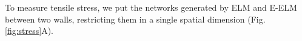 \documentclass[nofootinbib,preprint,floatfix,titlepage,endfloats]{revtex4} %
\begin{document}

 
To measure tensile stress, we put the networks generated by ELM and E-ELM between two walls, restricting them in a single spatial dimension (Fig. \ref{fig:stress}A). 
\end{document}
